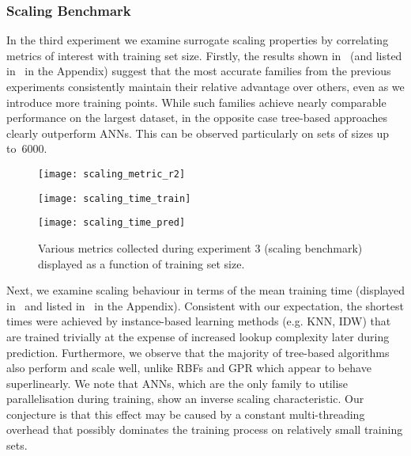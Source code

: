 \subsubsection{Scaling Benchmark}

In the third experiment we examine surrogate scaling properties by correlating
metrics of interest with training set size. Firstly, the results shown 
in~ (and listed in~ in
the Appendix) suggest that the most accurate families from the previous experiments
consistently maintain their relative advantage over others, even as we introduce
more training points. While such families achieve nearly comparable
performance on the largest dataset, in the opposite case tree-based approaches
clearly outperform ANNs. This can be observed
particularly on sets of sizes up to~\num{6000}.

\begin{figure}[h]
	\centering
	\begin{minipage}{0.333\textwidth}
		\texttt{[image: scaling\_metric\_r2]}
	\end{minipage}\hfill%
	\begin{minipage}{0.333\textwidth}
		\texttt{[image: scaling\_time\_train]}
	\end{minipage}\hfill%
	\begin{minipage}{0.333\textwidth}
		\texttt{[image: scaling\_time\_pred]}
	\end{minipage}
	\caption{Various metrics collected during experiment 3 (scaling
	benchmark) displayed as a function of training set size.}
	\label{fig:scaling}
\end{figure}

Next, we examine scaling behaviour in terms of the mean training time (displayed
in~ and listed in~ in
the Appendix). Consistent with our expectation, the shortest times
were achieved by instance-based learning methods (e.g. KNN, IDW) that
are trained trivially at the expense of increased lookup complexity later during prediction.
Furthermore, we observe that the majority of tree-based algorithms also perform
and scale well, unlike RBFs and GPR which appear to behave superlinearly. We note that ANNs,
which are the only family to utilise parallelisation during training, show an
inverse scaling characteristic. Our conjecture is that this effect may be caused
by a constant multi-threading overhead that possibly dominates the training process
on relatively small training sets.

